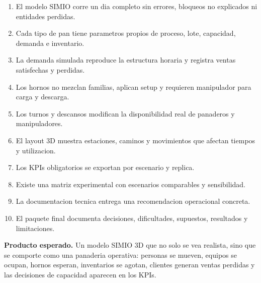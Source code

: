 \documentclass[12pt]{article}
\begin{document}
\begin{enumerate}
  \item El modelo SIMIO corre un dia completo sin errores, bloqueos no explicados ni entidades perdidas.
  \item Cada tipo de pan tiene parametros propios de proceso, lote, capacidad, demanda e inventario.
  \item La demanda simulada reproduce la estructura horaria y registra ventas satisfechas y perdidas.
  \item Los hornos no mezclan familias, aplican setup y requieren manipulador para carga y descarga.
  \item Los turnos y descansos modifican la disponibilidad real de panaderos y manipuladores.
  \item El layout 3D muestra estaciones, caminos y movimientos que afectan tiempos y utilizacion.
  \item Los KPIs obligatorios se exportan por escenario y replica.
  \item Existe una matriz experimental con escenarios comparables y sensibilidad.
  \item La documentacion tecnica entrega una recomendacion operacional concreta.
  \item El paquete final documenta decisiones, dificultades, supuestos, resultados y limitaciones.
\end{enumerate}

\begin{center}
\colorbox{azulclaro}{%
\parbox{0.92\textwidth}{%
\textbf{Producto esperado.} Un modelo SIMIO 3D que no solo se vea realista, sino que se comporte como una panaderia operativa: personas se mueven, equipos se ocupan, hornos esperan, inventarios se agotan, clientes generan ventas perdidas y las decisiones de capacidad aparecen en los KPIs.
}}
\end{center}
\end{document}
